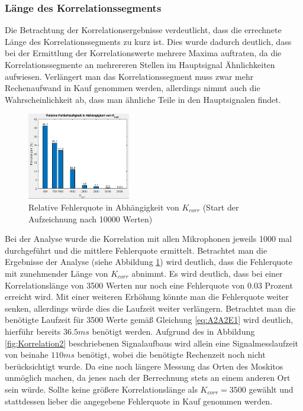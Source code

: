 \subsubsection{Länge des Korrelationssegments}

Die Betrachtung der Korrelationsergebnisse verdeutlicht, dass die errechnete Länge des Korrelationssegments zu kurz ist. Dies wurde dadurch deutlich, dass bei der Ermittlung der Korrelationswerte mehrere Maxima auftraten, da die Korrelationssegmente an mehrereren Stellen im Hauptsignal Ähnlichkeiten aufwiesen. Verlängert man das Korrelationssegment muss zwar mehr Rechenaufwand in Kauf genommen werden, allerdings nimmt auch die Wahrscheinlichkeit ab, dass man ähnliche Teile in den Hauptsignalen findet.\\


\begin{figure}
\centering 
\includegraphics[width=0.4\textwidth]{KorrelationsAnalyse1}
\caption{Relative Fehlerquote in Abhängigkeit von $K_{corr}$  \linebreak(Start der Aufzeichnung nach 10000 Werten)} \label{fig:KorrelationAnalyse1}
\end{figure}

Bei der Analyse wurde die Korrelation mit allen Mikrophonen jeweils 1000 mal durchgeführt und die mittlere Fehlerquote ermittelt. Betrachtet man die Ergebnisse der Analyse (siehe Abbildung \ref{fig:KorrelationAnalyse1}) wird deutlich, dass die Fehlerquote mit zunehmender Länge von $K_{corr}$ abnimmt. Es wird deutlich, dass bei einer Korrelationslänge von 3500 Werten nur noch eine Fehlerquote von $0.03$  Prozent  erreicht wird. Mit einer weiteren Erhöhung könnte man die Fehlerquote weiter senken, allerdings würde dies die Laufzeit weiter verlängern. Betrachtet man die benötigte Laufzeit für 3500 Werte gemäß Gleichung \ref{eq:A2A2E1} wird deutlich, hierführ bereits $36.5ms$ benötigt werden.
Aufgrund des in Abbildung \ref{fig:Korrelation2} beschriebenen Signalaufbaus wird allein eine Signalmesslaufzeit von beinahe $110ms$ benötigt, wobei die benötigte Rechenzeit noch nicht berücksichtigt wurde.
Da eine noch längere Messung das Orten des Moskitos unmöglich machen, da jenes nach der Berrechnung stets an einem anderen Ort sein würde. Sollte keine größere Korrelationslänge als $K_{corr} = 3500$ gewählt  und stattdessen lieber die angegebene  Fehlerquote in Kauf genommen werden.


